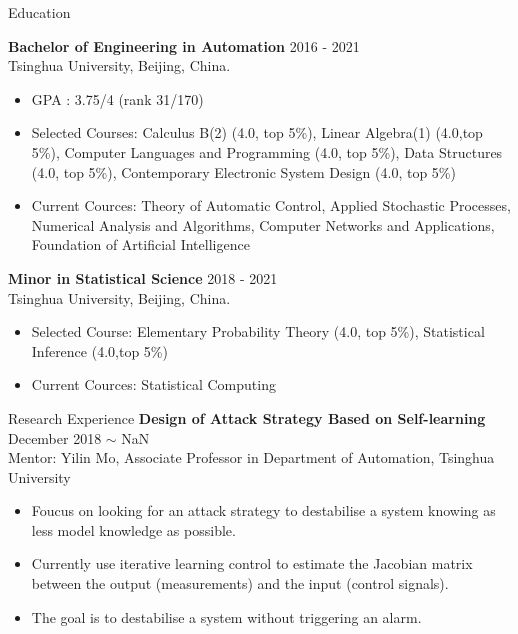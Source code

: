 \documentclass{resume} %
\begin{document}

\begin{rSection}{Education}

{\bf Bachelor of Engineering in Automation} \hfill {2016 - 2021}\\
Tsinghua University, Beijing, China.
	\begin{itemize}
		\item  GPA : 3.75/4 (rank 31/170)
		\item Selected Courses: Calculus B(2) (4.0, top 5\%), Linear Algebra(1) (4.0,top 5\%), Computer Languages and Programming (4.0, top 5\%), Data Structures (4.0, top 5\%), Contemporary Electronic System Design (4.0, top 5\%)
		\item Current Cources: Theory of Automatic Control, Applied Stochastic Processes, Numerical Analysis and Algorithms, Computer Networks and Applications, Foundation of Artificial Intelligence
	\end{itemize}


{\textbf{Minor in Statistical Science}}  \hfill 2018 - 2021\\
Tsinghua University, Beijing, China.
	\begin{itemize}
		\item Selected Course: Elementary Probability Theory (4.0, top 5\%), Statistical Inference (4.0,top 5\%)
		\item Current Cources: Statistical Computing
	\end{itemize}

\end{rSection}



\begin{rSection}{Research Experience}
{\textbf{Design of Attack Strategy Based on Self-learning}} \hfill December 2018 $\sim$ NaN\\
Mentor: Yilin Mo, Associate Professor in Department of Automation, Tsinghua University\\
	\begin{itemize}
		\item Foucus on looking for an attack strategy to destabilise a system knowing as less model knowledge as possible.\\
		\item Currently use iterative learning control to estimate the Jacobian matrix between the output (measurements) and the input (control signals).\\
		\item The goal is to destabilise a system without triggering an alarm.
	\end{itemize}

\end{rSection} 
\end{document}
